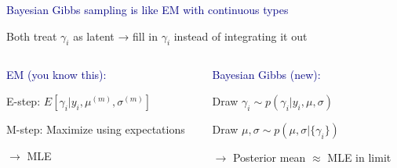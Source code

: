 \documentclass[aspectratio=169]{beamer}
\begin{document}
\begin{frame}

\textcolor{navy}{Bayesian Gibbs sampling is like EM with continuous types}

\bigskip

Both treat $\gamma_i$ as latent → fill in $\gamma_i$ instead of integrating it out

\bigskip
\bigskip

\begin{columns}
\begin{column}{0.48\textwidth}
\textcolor{navy}{EM (you know this):}

\bigskip

E-step: $E[\gamma_i|y_i, \mu^{(m)}, \sigma^{(m)}]$

\bigskip

M-step: Maximize using expectations

\bigskip

$\rightarrow$ MLE

\end{column}

\begin{column}{0.48\textwidth}
\textcolor{navy}{Bayesian Gibbs (new):}

\bigskip

Draw $\gamma_i \sim p(\gamma_i|y_i, \mu, \sigma)$

\bigskip

Draw $\mu, \sigma \sim p(\mu, \sigma|\{\gamma_i\})$

\bigskip

$\rightarrow$ Posterior mean $\approx$ MLE in limit

\end{column}
\end{columns}


\end{frame}
\end{document}
